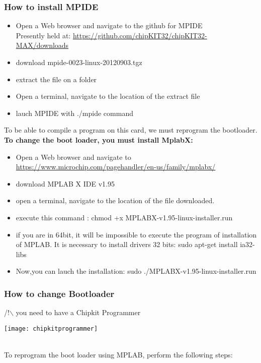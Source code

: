 \documentclass[10pt,a4paper]{report}
\begin{document}
\subsubsection*{How to install MPIDE}

\begin{itemize}
\item Open a Web browser and navigate to the github for MPIDE \\ Presently held at: \url{https://github.com/chipKIT32/chipKIT32-MAX/downloads}
\item download mpide-0023-linux-20120903.tgz
\item extract the file on a folder
\item Open a terminal, navigate to the location of the extract file
\item lauch MPIDE with ./mpide command\\
\end{itemize}
To be able to compile a program on this card, we must reprogram the bootloader.\\

\textbf{To change the boot loader, you must install MplabX:\\}
\begin{itemize}
\item Open a Web browser and navigate to \url{https://www.microchip.com/pagehandler/en-us/family/mplabx/}
\item download MPLAB X IDE v1.95
\item open a terminal, navigate to the location of the file downloaded.
\item execute this command : chmod +x MPLABX-v1.95-linux-installer.run
\item if you are in 64bit,  it will be impossible to execute the program of installation of MPLAB. It is necessary to install drivers 32 bits:   sudo apt-get install ia32-libs
\item Now,you can lauch the installation: sudo ./MPLABX-v1.95-linux-installer.run
\end{itemize}
\subsubsection*{How to change Bootloader}

/!$\backslash$ you need to have a Chipkit Programmer
\begin{minipage}[c]{0.1\linewidth}
    \centering \texttt{[image: chipkitprogrammer]}
\end{minipage}\hfill 
\\ To reprogram the boot loader using MPLAB,
perform the following steps: \\
\end{document}
